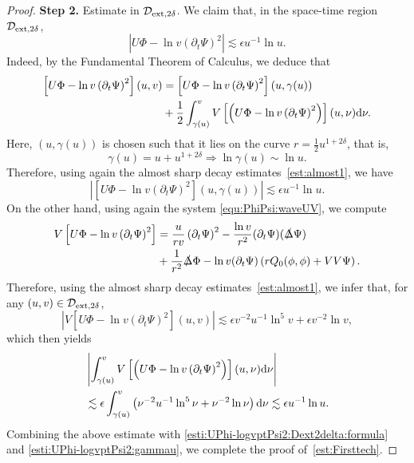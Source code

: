 \documentclass[a4paper,reqno]{amsart}
\theoremstyle{definition}
\numberwithin{equation}{section}
\def \d {{\rm{d}}}
\def \pt{\partial_{t}}
\def\Deltas{\slashed{\Delta}}
\def\ep{\epsilon}
\def\lab{\label}
\begin{document}
\begin{proof}
\smallskip
\textbf{Step 2.} Estimate in $\mathcal{D}_{\rm{ext},2\delta}$.  We claim that, in the space-time region $\mathcal{D}_{\rm{ext},2\delta}$, 
\begin{equation}\label{est:Firsttech}
\left|U\Phi-\ln v \left(\pt \Psi\right)^{2}\right|\lesssim \ep u^{-1}\ln u.
\end{equation}
Indeed, by the Fundamental Theorem of Calculus, we deduce that
\begin{equation}
\lab{esti:UPhi-logvptPsi2:Dext2delta:formula}
\begin{aligned}
\left[U\Phi-\ln v\left(\pt \Psi\right)^{2}\right](u,v)
&=\left[U\Phi-\ln v\left(\pt \Psi\right)^{2}\right](u,\gamma(u))\\
&+\frac{1}{2}\int_{\gamma(u)}^{v}
V\left[\left(U\Phi-\ln v\left(\pt \Psi\right)^{2}\right)\right](u,\nu)\d \nu.
\end{aligned}
\end{equation}
Here, $(u,\gamma(u))$ is chosen such that it lies on the curve $r=\frac{1}{2}u^{1+2\delta}$, that is,
\begin{equation*}
\gamma(u)=u+u^{1+2\delta}\Longrightarrow \ln \gamma(u)\sim \ln u.
\end{equation*}
Therefore, using again
the almost sharp decay estimates~\eqref{est:almost1}, we have
\begin{equation}
\lab{esti:UPhi-logvptPsi2:gammau}
    \left|\left[U\Phi-\ln v\left(\pt \Psi\right)^{2}\right](u,\gamma(u))\right|\lesssim \ep u^{-1}\ln u.
\end{equation}
On the other hand, using again the system \eqref{equ:PhiPsi:waveUV}, we compute 
\begin{equation}\label{eq:non-trans}
\begin{aligned}
V\left[U\Phi-\ln v\left(\pt \Psi\right)^{2}\right]
&=\frac{u}{rv}\left(\pt \Psi\right)^{2}
-\frac{\ln v}{r^{2}}(\pt \Psi)(\Deltas\Psi)\\
&+\frac{1}{r^{2}}\Deltas\Phi-\ln v
(\pt \Psi)\left(rQ_{0}(\phi,\phi)+VV\Psi\right).
\end{aligned}
\end{equation}
Therefore, using the almost sharp decay estimates~\eqref{est:almost1}, we infer that, for any $(u,v)\in \mathcal{D}_{\rm{ext},2\delta}$,
\begin{equation*}
\left|V\left[U\Phi-\ln v\left(\pt \Psi\right)^{2}\right](u,v)\right|\lesssim \ep v^{-2}u^{-1}\ln^{5}v+\ep v^{-2}\ln v,
\end{equation*}
which then yields 
\begin{equation*}
\begin{aligned}
&\left|\int_{\gamma(u)}^{v}
V\left[\left(U\Phi-\ln v\left(\pt \Psi\right)^{2}\right)\right](u,\nu)\d \nu\right|\\
&\lesssim
\ep \int_{\gamma(u)}^{v}\left(\nu^{-2}u^{-1}\ln^5 \nu +\nu^{-2}\ln \nu \right)\d \nu\lesssim \ep u^{-1}\ln u.
\end{aligned}
\end{equation*}
Combining the above estimate with \eqref{esti:UPhi-logvptPsi2:Dext2delta:formula} and \eqref{esti:UPhi-logvptPsi2:gammau}, we complete the proof of~\eqref{est:Firsttech}.


\end{proof}
\end{document}
